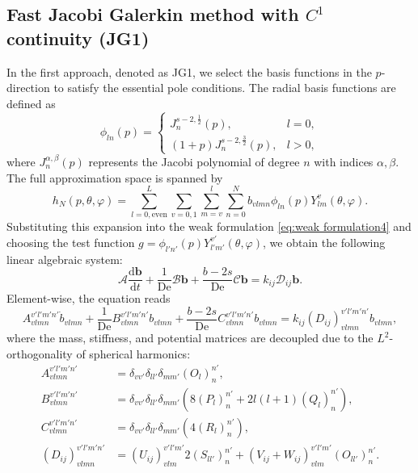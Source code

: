\documentclass[preprint,12pt]{elsarticle}
\begin{document}
\subsection{Fast Jacobi Galerkin method with $C^1$ continuity (JG1)}
In the first approach, denoted as JG1, we select the basis functions in the $p$-direction to satisfy the essential pole conditions. The radial basis functions are defined as
\begin{equation}
    \phi_{ln}(p)=\begin{cases}
        J_n^{s-2,\frac{1}{2}}(p), & l=0, \\
        (1+p)J_n^{s-2,\frac{3}{2}}(p), & l>0,
    \end{cases}
\end{equation}
where $J_n^{\alpha,\beta}(p)$ represents the Jacobi polynomial of degree $n$ with indices $\alpha, \beta$. The full approximation space is spanned by
\begin{equation}
    h_N(p,\theta,\varphi)=\sum_{l=0, \text{even}}^{L}\sum_{v=0,1}\sum_{m=v}^{l}\sum_{n=0}^{N} b_{vlmn}\phi_{ln}(p)Y_{lm}^v(\theta,\varphi).
\end{equation}
Substituting this expansion into the weak formulation \eqref{eq:weak formulation4} and choosing the test function $g=\phi_{l'n'}(p)Y_{l'm'}^{v'}(\theta,\varphi)$, we obtain the following linear algebraic system:
\begin{equation}
    \mathcal{A} \frac{\mathrm{d}\mathbf{b}}{\mathrm{d}t} + \frac{1}{\mathrm{De}}\mathcal{B}\mathbf{b} + \frac{b-2s}{\mathrm{De}}\mathcal{C}\mathbf{b} = k_{ij}\mathcal{D}_{ij}\mathbf{b}.
\end{equation}
Element-wise, the equation reads
\begin{equation}
    A_{vlmn}^{v'l'm'n'}\dot{b}_{vlmn} + \frac{1}{\mathrm{De}}B_{vlmn}^{v'l'm'n'}b_{vlmn} + \frac{b-2s}{\mathrm{De}}C_{vlmn}^{v'l'm'n'}b_{vlmn} = k_{ij}(D_{ij})_{vlmn}^{v'l'm'n'}b_{vlmn},
\end{equation}
where the mass, stiffness, and potential matrices are decoupled due to the $L^2$-orthogonality of spherical harmonics:
\begin{align*}
    A_{vlmn}^{v'l'm'n'} &= \delta_{vv'}\delta_{ll'}\delta_{mm'} (O_l)_n^{n'}, \\
    B_{vlmn}^{v'l'm'n'} &= \delta_{vv'}\delta_{ll'}\delta_{mm'} \left(8(P_l)_n^{n'} + 2l(l+1)(Q_l)_n^{n'}\right), \\
    C_{vlmn}^{v'l'm'n'} &= \delta_{vv'}\delta_{ll'}\delta_{mm'} \left(4(R_l)_n^{n'}\right), \\
    (D_{ij})_{vlmn}^{v'l'm'n'} &= (U_{ij})_{vlm}^{v'l'm'} 2(S_{ll'})_n^{n'} + (V_{ij}+W_{ij})_{vlm}^{v'l'm'} (O_{ll'})_n^{n'}.
\end{align*}
\end{document}
